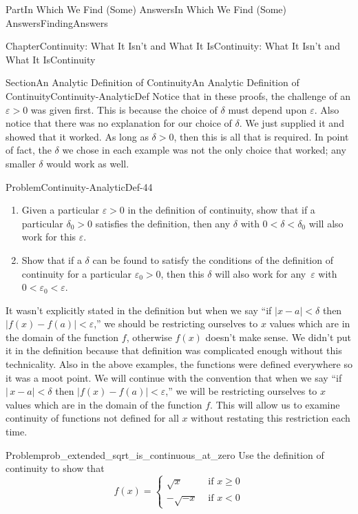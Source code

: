 \documentclass[oneside,10pt,]{book}
\numberwithin{equation}{part}
\newcommand{\abs}[1]{\left|#1\right|}
\newcommand{\eps}{\varepsilon}
\newcommand{\lt}{<}
\newcommand{\amp}{&}
\begin{document}
\begin{partptx}{Part}{In Which We Find (Some) Answers}{}{In Which We Find (Some) Answers}{}{}{FindingAnswers}
\begin{chapterptx}{Chapter}{Continuity: What It Isn't and What It Is}{}{Continuity: What It Isn't and What It Is}{}{}{Continuity}
\begin{sectionptx}{Section}{An Analytic Definition of Continuity}{}{An Analytic Definition of Continuity}{}{}{Continuity-AnalyticDef}
Notice that in these proofs, the challenge of an \(\eps>0\) was given first.  This is because the choice of \(\delta\) must depend upon \(\eps\).  Also notice that there was no explanation for our choice of \(\delta\).  We just supplied it and showed that it worked.  As long as \(\delta>0\), then this is all that is required.  In point of fact, the \(\delta\) we chose in each example was not the only choice that worked; any smaller \(\delta\) would work as well.%
\begin{problem}{Problem}{}{Continuity-AnalyticDef-44}%
\begin{enumerate}[font=\bfseries,label=(\alph*),ref=\alph*]%
\item{}Given a particular \(\eps>0\) in the definition of continuity, show that if a particular \(\delta_0>0\) satisfies the definition, then any \(\delta\) with \(0\lt \delta\lt \delta_0\) will also work for this \(\eps\).%
\item{}Show that if a \(\delta\) can be found to satisfy the conditions of the definition of continuity for a particular \(\eps_0>0\), then this \(\delta\) will also work for any \(\,\eps\) with \(0\lt \eps_0\lt
\eps\).%
\end{enumerate}%
\end{problem}
It wasn't explicitly stated in the definition but when we say ``if \(\abs{x-a}\lt \delta\) then \(|f(x)-f(a)|\lt
\eps\),'' we should be restricting ourselves to \(x\) values which are in the domain of the function \(f\), otherwise \(f(x)\) doesn't make sense.  We didn't put it in the definition because that definition was complicated enough without this technicality.  Also in the above examples, the functions were defined everywhere so it was a moot point.  We will continue with the convention that when we say ``if \(|\,x-a|\lt \delta\) then \(|f(x)-f(a)|\lt \eps\),'' we will be restricting ourselves to \(x\) values which are in the domain of the function \(f\).  This will allow us to examine continuity of functions not defined for all \(x\) without restating this restriction each time.%
\begin{problem}{Problem}{}{prob_extended_sqrt_is_continuous_at_zero}%
 Use the definition of continuity to show that%
\begin{equation*}
f(x)= \begin{cases}\sqrt{x} \amp  \text{ if }  x\ge0\\ -\sqrt{-x} \amp  \text{ if }  x\lt 0 \end{cases}
\end{equation*}

\end{problem}
\end{sectionptx}
\end{chapterptx}
\end{partptx}
\end{document}

